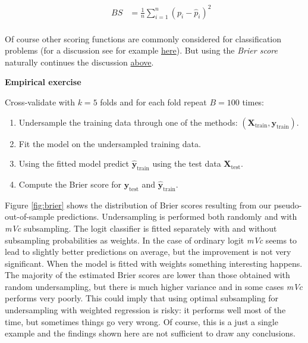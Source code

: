 \documentclass[
]{book}
\providecommand{\tightlist}{%
  \setlength{\itemsep}{0pt}\setlength{\parskip}{0pt}}
\begin{document}
\[
\begin{equation}
\begin{aligned}
&& BS&= \frac{1}{n} \sum_{i=1}^{n} (p_i-\hat{p}_i)^2 \\
\end{aligned}
\label{eq:brier}
\end{equation}
\]

Of course other scoring functions are commonly considered for classification problems (for a discussion see for example \href{https://stats.stackexchange.com/questions/172945/rmse-root-mean-squared-error-for-logistic-models}{here}). But using the \emph{Brier score} naturally continues the discussion \protect\hyperlink{subsampling}{above}.

\textbf{Empirical exercise}

Cross-validate with \(k=5\) folds and for each fold repeat \(B=100\) times:

\begin{enumerate}
\def\labelenumi{\arabic{enumi}.}
\tightlist
\item
  Undersample the training data through one of the methods: \((\mathbf{X}_{\text{train}},\mathbf{y}_{\text{train}})\).
\item
  Fit the model on the undersampled training data.
\item
  Using the fitted model predict \(\hat{\mathbf{y}}_{\text{train}}\) using the test data \(\mathbf{X}_{\text{test}}\).
\item
  Compute the Brier score for \(\mathbf{y}_{\text{test}}\) and \(\hat{\mathbf{y}}_{\text{train}}\).
\end{enumerate}

Figure \ref{fig:brier} shows the distribution of Brier scores resulting from our pseudo-out-of-sample predictions. Undersampling is performed both randomly and with \emph{mVc} subsampling. The logit classifier is fitted separately with and without subsampling probabilities as weights. In the case of ordinary logit \emph{mVc} seems to lead to slightly better predictions on average, but the improvement is not very significant. When the model is fitted with weights something interesting happens. The majority of the estimated Brier scores are lower than those obtained with random undersampling, but there is much higher variance and in some cases \emph{mVc} performs very poorly. This could imply that using optimal subsampling for undersampling with weighted regression is risky: it performs well most of the time, but sometimes things go very wrong. Of course, this is a just a single example and the findings shown here are not sufficient to draw any conclusions.
\end{document}
